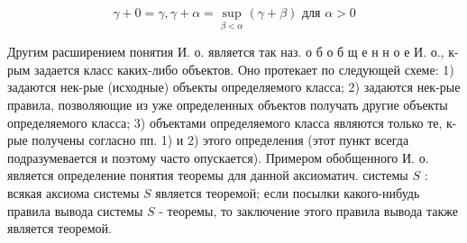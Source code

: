 \documentclass[10pt]{article}
\begin{document}
\[

\gamma+0=\gamma, \gamma+\alpha=\sup _{\beta<\alpha}(\gamma+\beta) \text { для } \alpha>0

\]



Другим расширением понятия И. о. является так наз. о б о б щ е н н о е И. о., к-рым задается класс каких-либо объектов. Оно протекает по следующей схеме: 1) задаются нек-рые (исходные) объекты определяемого класса; 2) задаются нек-рые правила, позволяющие из уже определенных объектов получать другие объекты определяемого класса; 3) объектами определяемого класса являются только те, к-рые получены согласно пп. 1) и 2) этого определения (этот пункт всегда подразумевается и поэтому часто опускается). Примером обобщенного И. о. является определение понятия теоремы для данной аксиоматич. системы $S$ : всякая аксиома системы $S$ является теоремой; если посылки какого-нибудь правила вывода системы $S$ - теоремы, то заключение этого правила вывода также является теоремой.
\end{document}
